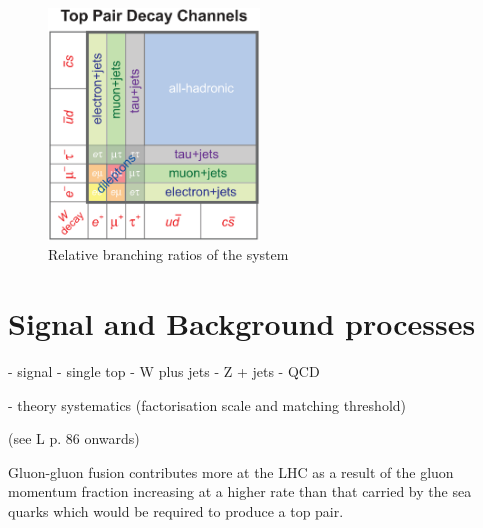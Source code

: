 \begin{figure}[hbtp]
   \centering
     \includegraphics[width=0.5\textwidth]{Chapters/02_Theory/Images/top_pair_decay_channels.eps}\hfill
     \caption{Relative branching ratios of the \ttbar system}
     \label{fig:ttbar_branching_ratios}
\end{figure}


\section{\ttbar Signal and Background processes}
- signal
- single top
- W plus jets
- Z + jets
- QCD

- theory systematics (factorisation scale and matching threshold)

(see L p. 86 onwards)

Gluon-gluon fusion contributes more at the LHC as a result of the gluon momentum fraction increasing at a
higher rate than that carried by the sea quarks which would be required to produce a top pair.